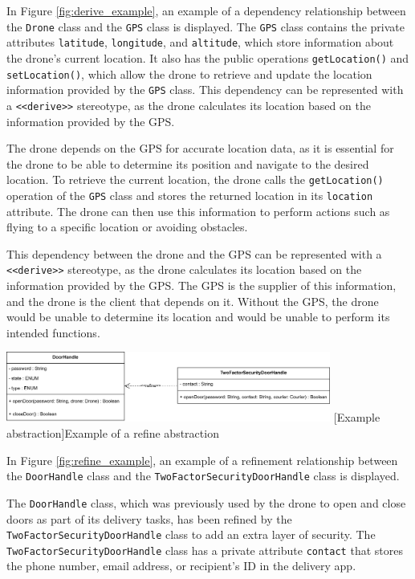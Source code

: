 \documentclass[
	12pt,
    a4paper,
    egregdoesnotlikesansseriftitles, %
    toc=chapterentrywithdots,
    oneside, openany,
    titlepage,
    parskip=half,
    headings=normal,  %
    listof=totoc,
    bibliography=totocnumbered,
    index=totoc,
    captions=tableheading,  %
    listof=flat,
    numbers=noenddot, %
    final]
    {scrbook}
\begin{document}
In Figure \ref{fig:derive_example}, an example of a dependency relationship between the \texttt{Drone} class and the \texttt{GPS} class is displayed. 
The \texttt{GPS} class contains the private attributes \texttt{latitude}, \texttt{longitude}, and \texttt{altitude}, which store information about the drone's current location. It also has the public operations \texttt{getLocation()} and \texttt{setLocation()}, which allow the drone to retrieve and update the location information provided by the \texttt{GPS} class.
This dependency can be represented with a \texttt{<<derive>>} stereotype, as the drone calculates its location based on the information provided by the GPS.

The drone depends on the GPS for accurate location data, as it is essential for the drone to be able to determine its position and navigate to the desired location. To retrieve the current location, the drone calls the \texttt{getLocation()} operation of the \texttt{GPS} class and stores the returned location in its \texttt{location} attribute. The drone can then use this information to perform actions such as flying to a specific location or avoiding obstacles.

This dependency between the drone and the GPS can be represented with a \texttt{<<derive>>} stereotype, as the drone calculates its location based on the information provided by the GPS. 
The GPS is the supplier of this information, and the drone is the client that depends on it. 
Without the GPS, the drone would be unable to determine its location and would be unable to perform its intended functions.

\vspace{1em}
\begin{minipage}{\linewidth}
	\centering
	\includegraphics[width=0.8\textwidth]{figures/dependencies/refine.jpg}
	[Example abstraction]{Example of a refine abstraction}
	\label{fig:refine_example}
\end{minipage}

In Figure \ref{fig:refine_example}, an example of a refinement relationship between the \texttt{DoorHandle} class and the \texttt{TwoFactorSecurityDoorHandle} class is displayed.

The \texttt{DoorHandle} class, which was previously used by the drone to open and close doors as part of its delivery tasks, has been refined by the \texttt{TwoFactorSecurityDoorHandle} class to add an extra layer of security. The \texttt{TwoFactorSecurityDoorHandle} class has a private attribute \texttt{contact} that stores the phone number, email address, or recipient's ID in the delivery app.
\end{document}
